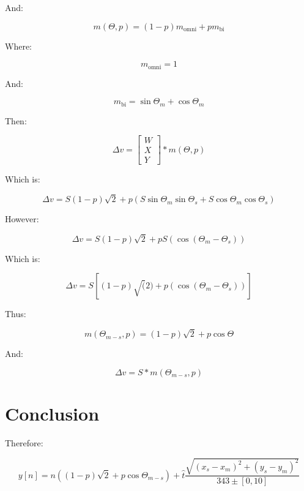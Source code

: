 \documentclass[fleqn]{IEEEtran}
\begin{document}
	And:
	
	\begin{equation}
		m(\Theta, p) = (1-p)m_\text{omni} + pm_\text{bi}
	\end{equation}
	
	Where:
	
	\begin{equation}
		m_\text{omni} = 1
	\end{equation}
	
	And:
	
	\begin{equation}
		m_\text{bi} = \sin{\Theta_m} + \cos{\Theta_m }
	\end{equation}
	
	Then:
	
	\begin{equation}
		\Delta{}v = \begin{bmatrix} W \\ X \\ Y \end{bmatrix} * m(\Theta, p)
	\end{equation}
	
	Which is:
	
	\begin{equation}
		\Delta{}v = S(1 - p)\sqrt{2} + p(S\sin{\Theta_m}\sin{\Theta_s} + S\cos{\Theta_m}\cos{\Theta_s})
	\end{equation}
	
	However:
	
	\begin{equation}
		\Delta{}v = S(1 - p)\sqrt{2} + pS(\cos{(\Theta_m - \Theta_s)})
	\end{equation}
	
	Which is:
	
	\begin{equation}
		\Delta{}v = S[(1-p)\sqrt(2) + p(\cos{(\Theta_m - \Theta_s)})]
	\end{equation}
	
	Thus:
	
	\begin{equation}
		m(\Theta_{m-s}, p) = (1-p)\sqrt{2} + p\cos{\Theta}
	\end{equation}
	
	And:
	
	\begin{equation}
		\Delta{}v = S * m(\Theta_{m-s}, p)
	\end{equation}

\section{Conclusion}

Therefore:

	\begin{equation}
		y[n] = n((1-p)\sqrt{2} + p\cos{\Theta_{m-s}}) + \hat{t}\frac{
			\sqrt{(x_s - x_m)^2 + (y_s - y_m)^2}
			}
			{
			343 \pm [0,10]
			}
	\end{equation}
\end{document}
